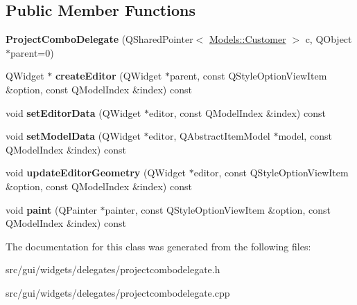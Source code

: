 \subsection*{Public Member Functions}
\begin{DoxyCompactItemize}
\item 
\hypertarget{classGui_1_1Widgets_1_1Delegates_1_1ProjectComboDelegate_a5fda87c3db87a0928717810a0ac2812f}{{\bfseries Project\+Combo\+Delegate} (Q\+Shared\+Pointer$<$ \hyperlink{classModels_1_1Customer}{Models\+::\+Customer} $>$ c, Q\+Object $\ast$parent=0)}\label{classGui_1_1Widgets_1_1Delegates_1_1ProjectComboDelegate_a5fda87c3db87a0928717810a0ac2812f}

\item 
\hypertarget{classGui_1_1Widgets_1_1Delegates_1_1ProjectComboDelegate_adbfc28a3e6de34dc63d7290ae5b5c053}{Q\+Widget $\ast$ {\bfseries create\+Editor} (Q\+Widget $\ast$parent, const Q\+Style\+Option\+View\+Item \&option, const Q\+Model\+Index \&index) const }\label{classGui_1_1Widgets_1_1Delegates_1_1ProjectComboDelegate_adbfc28a3e6de34dc63d7290ae5b5c053}

\item 
\hypertarget{classGui_1_1Widgets_1_1Delegates_1_1ProjectComboDelegate_a154846518810338a4ddaaa96ad29f7fe}{void {\bfseries set\+Editor\+Data} (Q\+Widget $\ast$editor, const Q\+Model\+Index \&index) const }\label{classGui_1_1Widgets_1_1Delegates_1_1ProjectComboDelegate_a154846518810338a4ddaaa96ad29f7fe}

\item 
\hypertarget{classGui_1_1Widgets_1_1Delegates_1_1ProjectComboDelegate_a7281f5f400d7f3a6e150cd17a3e95beb}{void {\bfseries set\+Model\+Data} (Q\+Widget $\ast$editor, Q\+Abstract\+Item\+Model $\ast$model, const Q\+Model\+Index \&index) const }\label{classGui_1_1Widgets_1_1Delegates_1_1ProjectComboDelegate_a7281f5f400d7f3a6e150cd17a3e95beb}

\item 
\hypertarget{classGui_1_1Widgets_1_1Delegates_1_1ProjectComboDelegate_a3ea80843021afbcb24012d505b61c2b6}{void {\bfseries update\+Editor\+Geometry} (Q\+Widget $\ast$editor, const Q\+Style\+Option\+View\+Item \&option, const Q\+Model\+Index \&index) const }\label{classGui_1_1Widgets_1_1Delegates_1_1ProjectComboDelegate_a3ea80843021afbcb24012d505b61c2b6}

\item 
\hypertarget{classGui_1_1Widgets_1_1Delegates_1_1ProjectComboDelegate_a20cbc84d26b83083fdf7efecae3407cf}{void {\bfseries paint} (Q\+Painter $\ast$painter, const Q\+Style\+Option\+View\+Item \&option, const Q\+Model\+Index \&index) const }\label{classGui_1_1Widgets_1_1Delegates_1_1ProjectComboDelegate_a20cbc84d26b83083fdf7efecae3407cf}

\end{DoxyCompactItemize}


The documentation for this class was generated from the following files\+:\begin{DoxyCompactItemize}
\item 
src/gui/widgets/delegates/projectcombodelegate.\+h\item 
src/gui/widgets/delegates/projectcombodelegate.\+cpp\end{DoxyCompactItemize}
